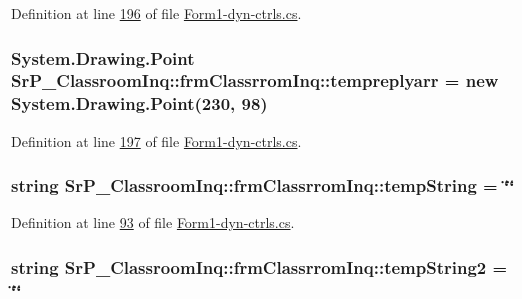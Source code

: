 \-Definition at line \hyperlink{_form1-dyn-ctrls_8cs_source_l00196}{196} of file \hyperlink{_form1-dyn-ctrls_8cs_source}{\-Form1-\/dyn-\/ctrls.\-cs}.

\hypertarget{class_sr_p___classroom_inq_1_1frm_classrrom_inq_ac6007ba00a6fab2fca4b74c0e588e850}{
\subsubsection[{tempreplyarr}]{\setlength{\rightskip}{0pt plus 5cm}\-System.\-Drawing.\-Point {\bf \-Sr\-P\-\_\-\-Classroom\-Inq\-::frm\-Classrrom\-Inq\-::tempreplyarr} = new \-System.\-Drawing.\-Point(230, 98)}}
\label{class_sr_p___classroom_inq_1_1frm_classrrom_inq_ac6007ba00a6fab2fca4b74c0e588e850}


\-Definition at line \hyperlink{_form1-dyn-ctrls_8cs_source_l00197}{197} of file \hyperlink{_form1-dyn-ctrls_8cs_source}{\-Form1-\/dyn-\/ctrls.\-cs}.

\hypertarget{class_sr_p___classroom_inq_1_1frm_classrrom_inq_aaad277eaea17731f132fb18aa3560a91}{
\subsubsection[{temp\-String}]{\setlength{\rightskip}{0pt plus 5cm}string {\bf \-Sr\-P\-\_\-\-Classroom\-Inq\-::frm\-Classrrom\-Inq\-::temp\-String} = \char`\"{}\char`\"{}}}
\label{class_sr_p___classroom_inq_1_1frm_classrrom_inq_aaad277eaea17731f132fb18aa3560a91}


\-Definition at line \hyperlink{_form1-dyn-ctrls_8cs_source_l00093}{93} of file \hyperlink{_form1-dyn-ctrls_8cs_source}{\-Form1-\/dyn-\/ctrls.\-cs}.

\hypertarget{class_sr_p___classroom_inq_1_1frm_classrrom_inq_a4ebaa0f6e4e9f61300c6aae855fc8fc1}{
\subsubsection[{temp\-String2}]{\setlength{\rightskip}{0pt plus 5cm}string {\bf \-Sr\-P\-\_\-\-Classroom\-Inq\-::frm\-Classrrom\-Inq\-::temp\-String2} = \char`\"{}\char`\"{}}}
\label{class_sr_p___classroom_inq_1_1frm_classrrom_inq_a4ebaa0f6e4e9f61300c6aae855fc8fc1}


